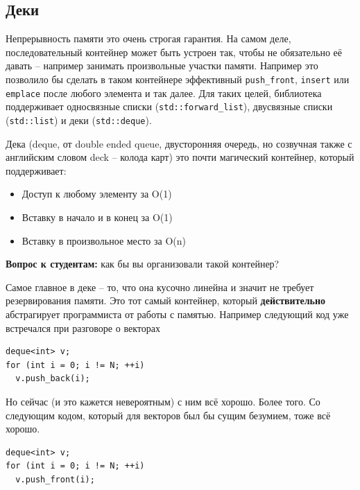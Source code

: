 \documentclass[a4paper,12pt,oneside]{book}
\newif\ifanswers
\begin{document}
\subsection{Деки}\label{subsub:Deque}

Непрерывность памяти это очень строгая гарантия. На самом деле, последовательный контейнер может быть устроен так, чтобы не обязательно её давать -- например занимать произвольные участки памяти. Например это позволило бы сделать в таком контейнере эффективный \lstinline!push_front!, \lstinline!insert! или \lstinline!emplace! после любого элемента и так далее. Для таких целей, библиотека поддерживает односвязные списки (\lstinline!std::forward_list!), двусвязные списки (\lstinline!std::list!) и деки (\lstinline!std::deque!).

Дека (deque, от double ended queue, двусторонняя очередь, но созвучная также с английским словом deck -- колода карт) это почти магический контейнер, который поддерживает:

\begin{itemize}
\item Доступ к любому элементу за O(1) 
\item Вставку в начало и в конец за O(1) 
\item Вставку в произвольное место за O(n)
\end{itemize}

\textbf{Вопрос к студентам:} как бы вы организовали такой контейнер?

\ifanswers
Правильный ответ: последовательность кусков памяти фиксированного размера, связанных общей таблицей-заголовком
\fi

Самое главное в деке -- то, что она кусочно линейна и значит не требует резервирования памяти. Это тот самый контейнер, который \textbf{действительно} абстрагирует программиста от работы с памятью. Например следующий код уже встречался при разговоре о векторах

\begin{lstlisting}
deque<int> v;
for (int i = 0; i != N; ++i)
  v.push_back(i);
\end{lstlisting}

Но сейчас (и это кажется невероятным) с ним всё хорошо. Более того. Со следующим кодом, который для векторов был бы сущим безумием, тоже всё хорошо.

\begin{lstlisting}
deque<int> v;
for (int i = 0; i != N; ++i)
  v.push_front(i);
\end{lstlisting}
\end{document}
